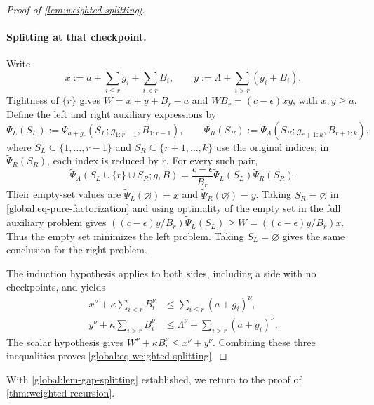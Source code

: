 \documentclass[11pt,letterpaper]{article}
\theoremstyle{definition}
\begin{document}
\begin{proof}[Proof of \cref{lem:weighted-splitting}]
\paragraph{Splitting at that checkpoint.}
Write
\[
  x:=a+\sum_{i\le r}g_i+\sum_{i<r}B_i,
  \qquad y:=\Lambda+\sum_{i>r}(g_i+B_i).
\]
Tightness of $\{r\}$ gives $W=x+y+B_r-a$ and $WB_r=(c-\epsilon) xy$, with $x,y\ge a$.
Define the left and right auxiliary expressions by
\[
  \widetilde\Psi_L(S_L):=\widetilde\Psi_{a+g_r}(S_L;g_{1:r-1},B_{1:r-1}),
  \qquad
  \widetilde\Psi_R(S_R):=\widetilde\Psi_\Lambda(S_R;g_{r+1:k},B_{r+1:k}),
\]
where $S_L\subseteq\{1,\ldots,r-1\}$ and $S_R\subseteq\{r+1,\ldots,k\}$ use the original indices; in $\widetilde\Psi_R(S_R)$, each index is reduced by $r$.
For every such pair,
\begin{equation}
  \widetilde\Psi_\Lambda(S_L\cup\{r\}\cup S_R;g,B)
  =\frac{c-\epsilon}{B_r}\widetilde\Psi_L(S_L)\widetilde\Psi_R(S_R).
  \label{global:eq-pure-factorization}
\end{equation}
Their empty-set values are $\widetilde\Psi_L(\varnothing)=x$ and $\widetilde\Psi_R(\varnothing)=y$.
Taking $S_R=\varnothing$ in \eqref{global:eq-pure-factorization} and using optimality of the empty set in the full auxiliary problem gives $((c-\epsilon) y/B_r)\widetilde\Psi_L(S_L)\ge W=((c-\epsilon) y/B_r)x$.
Thus the empty set minimizes the left problem.
Taking $S_L=\varnothing$ gives the same conclusion for the right problem.

The induction hypothesis applies to both sides, including a side with no checkpoints, and yields
\begin{align*}
  x^\nu+\kappa\sum_{i<r}B_i^\nu
    &\le\sum_{i\le r}(a+g_i)^\nu,\\
  y^\nu+\kappa\sum_{i>r}B_i^\nu
    &\le\Lambda^\nu+\sum_{i>r}(a+g_i)^\nu.
\end{align*}
The scalar hypothesis gives $W^\nu+\kappa B_r^\nu\le x^\nu+y^\nu$.
Combining these three inequalities proves \eqref{global:eq-weighted-splitting}.
\end{proof}

With \cref{global:lem-gap-splitting} established, we return to the proof of \cref{thm:weighted-recursion}.
\end{document}
